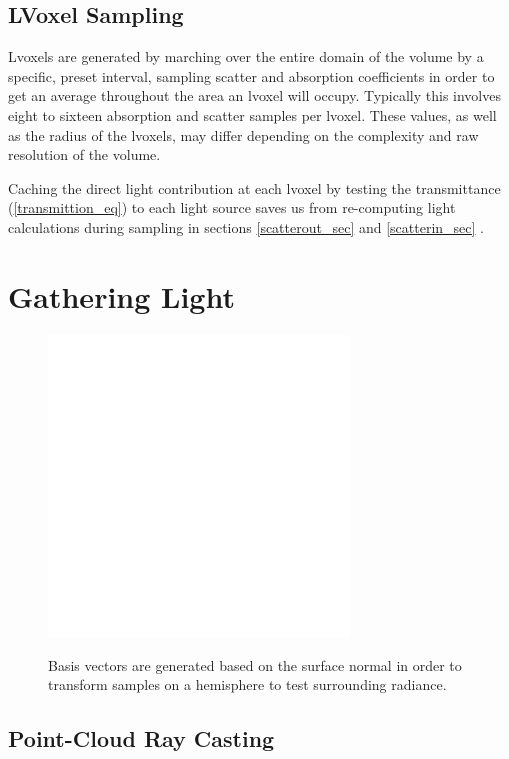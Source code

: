 \documentclass[12pt]{ucthesis}
\newcommand{\captionfonts}{\small\bf\ssp}
\begin{document}
\subsection{LVoxel Sampling}

Lvoxels are generated by marching over the entire domain of the volume by a specific, preset interval, sampling scatter and absorption coefficients in order to get an average throughout the area an lvoxel will occupy.  Typically this involves eight to sixteen absorption and scatter samples per lvoxel.  These values, as well as the radius of the lvoxels, may differ depending on the complexity and raw resolution of the volume.

Caching the direct light contribution at each lvoxel by testing the transmittance (\ref{transmittion_eq}) to each light source saves us from re-computing light calculations during sampling in sections \ref{scatterout_sec} and \ref{scatterin_sec} \cite{signotes:2010}.

\section{Gathering Light}

\begin{figure}[h!]
    \centering
    \includegraphics[width=80mm]{img/diag/orthnormal.pdf}
    \captionfonts
    \caption{Basis vectors are generated based on the surface normal in order to transform samples on a hemisphere to test surrounding radiance.}
    \label{fig:orthonormal}
\end{figure}

\subsection{Point-Cloud Ray Casting}
\end{document}
